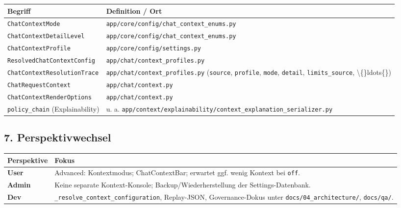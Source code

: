 \begin{center}
\begin{tabular}{ll}
\hline
Begriff & Definition / Ort \\
\hline
\texttt{ChatContextMode} & \texttt{app/core/config/chat\_context\_enums.py} \\
\texttt{ChatContextDetailLevel} & \texttt{app/core/config/chat\_context\_enums.py} \\
\texttt{ChatContextProfile} & \texttt{app/core/config/settings.py} \\
\texttt{ResolvedChatContextConfig} & \texttt{app/chat/context\_profiles.py} \\
\texttt{ChatContextResolutionTrace} & \texttt{app/chat/context\_profiles.py} (\texttt{source}, \texttt{profile}, \texttt{mode}, \texttt{detail}, \texttt{limits\_source}, \textbackslash\{\}ldots\{\}) \\
\texttt{ChatRequestContext} & \texttt{app/chat/context.py} \\
\texttt{ChatContextRenderOptions} & \texttt{app/chat/context.py} \\
\texttt{policy\_chain} (Explainability) & u. a. \texttt{app/context/explainability/context\_explanation\_serializer.py} \\
\hline
\end{tabular}
\end{center}

\subsection{7. Perspektivwechsel}

\begin{center}
\begin{tabular}{ll}
\hline
Perspektive & Fokus \\
\hline
\textbf{User} & Advanced: Kontextmodus; ChatContextBar; erwartet ggf. wenig Kontext bei \texttt{off}. \\
\textbf{Admin} & Keine separate Kontext-Konsole; Backup/Wiederherstellung der Settings-Datenbank. \\
\textbf{Dev} & \texttt{\_resolve\_context\_configuration}, Replay-JSON, Governance-Dokus unter \texttt{docs/04\_architecture/}, \texttt{docs/qa/}. \\
\hline
\end{tabular}
\end{center}
